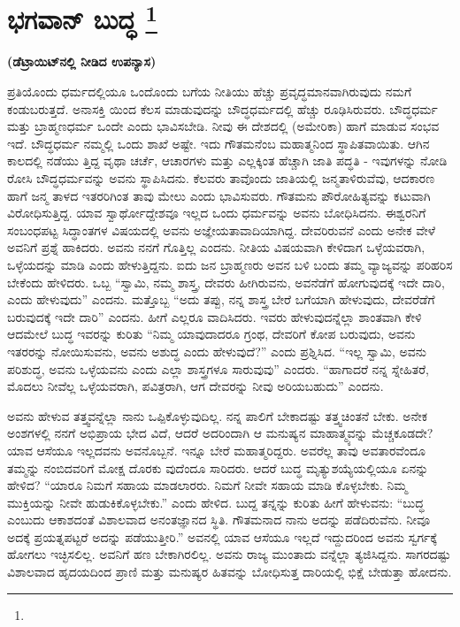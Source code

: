 
\chapter[ಭಗವಾನ್ ಬುದ್ಧ ]{ಭಗವಾನ್ ಬುದ್ಧ \protect\footnote{}}

\centerline{\textbf{(ಡೆಟ್ರಾಯಿಟ್​ನಲ್ಲಿ ನೀಡಿದ ಉಪನ್ಯಾಸ)}}

ಪ್ರತಿಯೊಂದು ಧರ್ಮದಲ್ಲಿಯೂ ಒಂದೊಂದು ಬಗೆಯ ನೀತಿಯು ಹೆಚ್ಚು ಪ್ರವೃದ್ಧಮಾನವಾಗಿರುವುದು ನಮಗೆ ಕಂಡುಬರುತ್ತದೆ. ಅನಾಸಕ್ತಿ ಯಿಂದ ಕೆಲಸ ಮಾಡುವುದನ್ನು ಬೌದ್ಧಧರ್ಮದಲ್ಲಿ ಹೆಚ್ಚು ರೂಢಿಸಿರುವರು. ಬೌದ್ಧಧರ್ಮ ಮತ್ತು ಬ್ರಾಹ್ಮಣಧರ್ಮ ಒಂದೇ ಎಂದು ಭಾವಿಸಬೇಡಿ. ನೀವು ಈ ದೇಶದಲ್ಲಿ (ಅಮೇರಿಕಾ) ಹಾಗೆ ಮಾಡುವ ಸಂಭವ ಇದೆ. ಬೌದ್ಧಧರ್ಮ ನಮ್ಮಲ್ಲಿ ಒಂದು ಶಾಖೆ ಅಷ್ಟೇ. ಇದು ಗೌತಮನೆಂಬ ಮಹಾತ್ಮನಿಂದ ಸ್ಥಾಪಿತವಾಯಿತು. ಆಗಿನ ಕಾಲದಲ್ಲಿ ನಡೆಯು ತ್ತಿದ್ದ ವೃಥಾ ಚರ್ಚೆ, ಆಚಾರಗಳು ಮತ್ತು ಎಲ್ಲಕ್ಕಿಂತ ಹೆಚ್ಚಾಗಿ ಜಾತಿ ಪದ್ಧತಿ - ಇವುಗಳನ್ನು ನೋಡಿ ರೋಸಿ ಬೌದ್ಧಧರ್ಮವನ್ನು ಅವನು ಸ್ಥಾಪಿಸಿದನು. ಕೆಲವರು ತಾವೊಂದು ಜಾತಿಯಲ್ಲಿ ಜನ್ಮತಾಳಿರುವೆವು, ಆದಕಾರಣ ಹಾಗೆ ಜನ್ಮ ತಾಳದ ಇತರರಿಗಿಂತ ತಾವು ಮೇಲು ಎಂದು ಭಾವಿಸುವರು. ಗೌತಮನು ಪೌರೋಹಿತ್ಯವನ್ನು ಕಟುವಾಗಿ ವಿರೋಧಿಸುತ್ತಿದ್ದ. ಯಾವ ಸ್ವಾರ್ಥೋದ್ದೇಶವೂ ಇಲ್ಲದ ಒಂದು ಧರ್ಮವನ್ನು ಅವನು ಬೋಧಿಸಿದನು. ಈಶ್ವರನಿಗೆ ಸಂಬಂಧಪಟ್ಟ ಸಿದ್ಧಾಂತಗಳ ವಿಷಯದಲ್ಲಿ ಅವನು ಅಜ್ಞೇಯತಾವಾದಿಯಾಗಿದ್ದ. ದೇವರಿರುವನೆ ಎಂದು ಅನೇಕ ವೇಳೆ ಅವನಿಗೆ ಪ್ರಶ್ನೆ ಹಾಕಿದರು. ಅವನು ನನಗೆ ಗೊತ್ತಿಲ್ಲ ಎಂದನು. ನೀತಿಯ ವಿಷಯವಾಗಿ ಕೇಳಿದಾಗ ಒಳ್ಳೆಯವರಾಗಿ, ಒಳ್ಳೆಯದನ್ನು ಮಾಡಿ ಎಂದು ಹೇಳುತ್ತಿದ್ದನು. ಐದು ಜನ ಬ್ರಾಹ್ಮಣರು ಅವನ ಬಳಿ ಬಂದು ತಮ್ಮ ವ್ಯಾಜ್ಯವನ್ನು ಪರಿಹರಿಸ ಬೇಕೆಂದು ಹೇಳಿದರು. ಒಬ್ಬ “ಸ್ವಾಮಿ, ನಮ್ಮ ಶಾಸ್ತ್ರ, ದೇವರು ಹೀಗಿರುವನು, ಅವನೆಡೆಗೆ ಹೋಗುವುದಕ್ಕೆ ಇದೇ ದಾರಿ, ಎಂದು ಹೇಳುವುದು” ಎಂದನು. ಮತ್ತೊಬ್ಬ “ಅದು ತಪ್ಪು, ನನ್ನ ಶಾಸ್ತ್ರ ಬೇರೆ ಬಗೆಯಾಗಿ ಹೇಳುವುದು, ದೇವರೆಡೆಗೆ ಬರುವುದಕ್ಕೆ ಇದೇ ದಾರಿ” ಎಂದನು. ಹೀಗೆ ಎಲ್ಲರೂ ವಾದಿಸಿದರು. ಇವರು ಹೇಳುವುದನ್ನೆಲ್ಲಾ ಶಾಂತವಾಗಿ ಕೇಳಿ ಆದಮೇಲೆ ಬುದ್ಧ ಇವರನ್ನು ಕುರಿತು “ನಿಮ್ಮ ಯಾವುದಾದರೂ ಗ್ರಂಥ, ದೇವರಿಗೆ ಕೋಪ ಬರುವುದು, ಅವನು ಇತರರನ್ನು ನೋಯಿಸುವನು, ಅವನು ಅಶುದ್ಧ ಎಂದು ಹೇಳುವುದೆ?” ಎಂದು ಪ್ರಶ್ನಿಸಿದ. “ಇಲ್ಲ ಸ್ವಾಮಿ, ಅವನು ಪರಿಶುದ್ಧ, ಅವನು ಒಳ್ಳೆಯವನು ಎಂದು ಎಲ್ಲಾ ಶಾಸ್ತ್ರಗಳೂ ಸಾರುವುವು” ಎಂದರು. “ಹಾಗಾದರೆ ನನ್ನ ಸ್ನೇಹಿತರೆ, ಮೊದಲು ನೀವೆಲ್ಲ ಒಳ್ಳೆಯವರಾಗಿ, ಪವಿತ್ರರಾಗಿ, ಆಗ ದೇವರನ್ನು ನೀವು ಅರಿಯಬಹುದು” ಎಂದನು.

ಅವನು ಹೇಳುವ ತತ್ತ್ವವನ್ನೆಲ್ಲಾ ನಾನು ಒಪ್ಪಿಕೊಳ್ಳುವುದಿಲ್ಲ. ನನ್ನ ಪಾಲಿಗೆ ಬೇಕಾದಷ್ಟು ತತ್ತ್ವಚಿಂತನೆ ಬೇಕು. ಅನೇಕ ಅಂಶಗಳಲ್ಲಿ ನನಗೆ ಅಭಿಪ್ರಾಯ ಭೇದ ವಿದೆ, ಆದರೆ ಅದರಿಂದಾಗಿ ಆ ಮನುಷ್ಯನ ಮಾಹಾತ್ಮ್ಯವನ್ನು ಮೆಚ್ಚಕೂಡದೇ? ಯಾವ ಆಸೆಯೂ ಇಲ್ಲದವನು ಅವನೊಬ್ಬನೆ. ಇನ್ನೂ ಬೇರೆ ಮಹಾತ್ಮರಿದ್ದರು. ಅವರೆಲ್ಲ ತಾವು ಅವತಾರವೆಂದೂ ತಮ್ಮನ್ನು ನಂಬಿದವರಿಗೆ ಮೋಕ್ಷ ದೊರಕು ವುದೆಂದೂ ಸಾರಿದರು. ಆದರೆ ಬುದ್ಧ ಮೃತ್ಯುಶಯ್ಯೆಯಲ್ಲಿಯೂ ಏನನ್ನು ಹೇಳಿದ? “ಯಾರೂ ನಿಮಗೆ ಸಹಾಯ ಮಾಡಲಾರರು. ನಿಮಗೆ ನೀವೇ ಸಹಾಯ ಮಾಡಿ ಕೊಳ್ಳಬೇಕು. ನಿಮ್ಮ ಮುಕ್ತಿಯನ್ನು ನೀವೇ ಹುಡುಕಿಕೊಳ್ಳಬೇಕು.” ಎಂದು ಹೇಳಿದ. ಬುದ್ದ ತನ್ನನ್ನು ಕುರಿತು ಹೀಗೆ ಹೇಳುವನು: “ಬುದ್ಧ ಎಂಬುದು ಆಕಾಶದಂತೆ ವಿಶಾಲವಾದ ಅನಂತಜ್ಞಾನದ ಸ್ಥಿತಿ. ಗೌತಮನಾದ ನಾನು ಅದನ್ನು ಪಡೆದಿರುವೆನು. ನೀವೂ ಅದಕ್ಕೆ ಪ್ರಯತ್ನಪಟ್ಟರೆ ಅದನ್ನು ಪಡೆಯುತ್ತೀರಿ.” ಅವನಲ್ಲಿ ಯಾವ ಆಸೆಯೂ ಇಲ್ಲದೆ ಇದ್ದುದರಿಂದ ಅವನು ಸ್ವರ್ಗಕ್ಕೆ ಹೋಗಲು ಇಚ್ಛಿಸಲಿಲ್ಲ. ಅವನಿಗೆ ಹಣ ಬೇಕಾಗಿರಲಿಲ್ಲ. ಅವನು ರಾಜ್ಯ ಮುಂತಾದು ವನ್ನೆಲ್ಲಾ ತ್ಯಜಿಸಿದ್ದನು. ಸಾಗರದಷ್ಟು ವಿಶಾಲವಾದ ಹೃದಯದಿಂದ ಪ್ರಾಣಿ ಮತ್ತು ಮನುಷ್ಯರ ಹಿತವನ್ನು ಬೋಧಿಸುತ್ತ ದಾರಿಯಲ್ಲಿ ಭಿಕ್ಷೆ ಬೇಡುತ್ತಾ ಹೋದನು.

